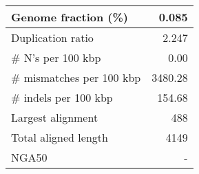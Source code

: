 \documentclass[12pt,a4paper]{article}
\begin{document}
\begin{table}[ht]
\begin{center}
\begin{tabular}{|l*{1}{|r}|}
Genome fraction (\%) & 0.085 \\ \hline
Duplication ratio & 2.247 \\ \hline
\# N's per 100 kbp & 0.00 \\ \hline
\# mismatches per 100 kbp & 3480.28 \\ \hline
\# indels per 100 kbp & 154.68 \\ \hline
Largest alignment & 488 \\ \hline
Total aligned length & 4149 \\ \hline
NGA50 & - \\ \hline
\end{tabular}
\end{center}
\end{table}
\end{document}
